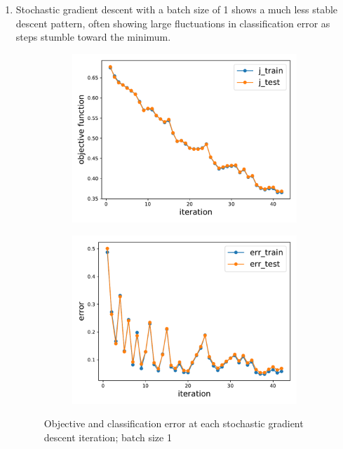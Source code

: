 \documentclass[11pt,letterpaper]{article}
\numberwithin{equation}{section}
\numberwithin{figure}{section}
\begin{document}
\begin{enumerate}
\begin{enumerate}
		\item Stochastic gradient descent with a batch size of 1 shows a much less stable descent pattern, often showing large fluctuations in classification error as steps stumble toward the minimum.

		\begin{figure}[H]
			\centering
			\begin{subfigure}[t]{.45\textwidth}
				\centering
				\includegraphics[width=\textwidth]{figures/mnist_sgd_1_obj.pdf}
			\end{subfigure}
			\begin{subfigure}[t]{.45\textwidth}
				\centering
				\includegraphics[width=\textwidth]{figures/mnist_sgd_1_err.pdf}
			\end{subfigure}
			\caption{Objective and classification error at each stochastic gradient descent iteration; batch size 1}
		\end{figure}


\end{enumerate}
\end{enumerate}
\end{document}
